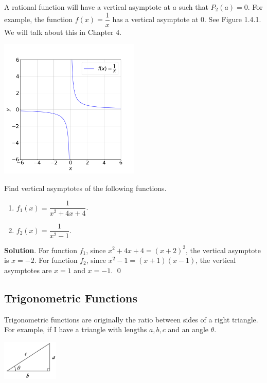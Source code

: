 \documentclass[11pt]{book}
\begin{document}
A rational function will have a vertical asymptote at $a$ such that $P_2(a)=0$. For example, the function $f(x)=\dfrac{1}{x}$ has a vertical asymptote at $0$. See Figure 1.4.1. We will talk about this in Chapter 4.

\begin{center}
    \includegraphics[width=0.5\textwidth]{reciprocal_of_x.png}
\end{center}

\begin{example}
    Find vertical asymptotes of the following functions.
    \vspace{-1em}
    \begin{multicols}{2}
        \begin{enumerate}
            \item $f_1(x)=\dfrac{1}{x^2+4x+4}$.
            \item $f_2(x)=\dfrac{1}{x^2-1}$.
        \end{enumerate}
    \end{multicols}
    \vspace{0.2em}
\end{example}
\textbf{Solution}. For function $f_1$, since $x^2+4x+4=(x+2)^2$, the vertical asymptote is $x=-2$. For function $f_2$, since $x^2-1=(x+1)(x-1)$, the vertical asymptotes are $x=1$ and $x=-1$. \qed

\subsection*{Trigonometric Functions}

Trigonometric functions are originally the ratio between sides of a right triangle. For example, if I have a triangle with lengths $a, b, c$ and an angle $\theta$.

\begin{center}
    \includegraphics[width=0.2\textwidth]{triangle.JPG}
\end{center}
\end{document}
